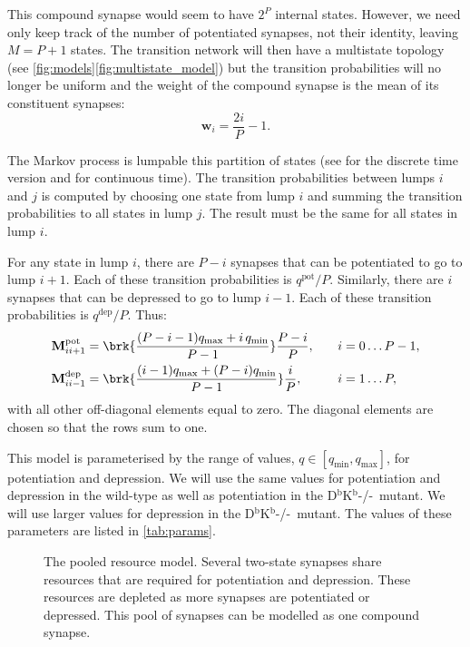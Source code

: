 \documentclass[12pt]{article}
\newcommand{\w}{\mathbf{w}}
\newcommand{\M}{\mathbf{M}}
\newcommand{\pot}{^{\text{pot}}}
\newcommand{\dep}{^{\text{dep}}}
\newcommand{\KO}{D$^\mathrm{b}$K$^\mathrm{b}$-/-}
\newcommand{\lmax}{_{\text{max}}}
\newcommand{\lmin}{_{\text{min}}}
\begin{document}
This compound synapse would seem to have $2^P$ internal states.
However, we need only keep track of the number of potentiated synapses, not their identity, leaving $M=P+1$ states.
The transition network will then have a multistate topology (see \autoref{fig:models}\ref{fig:multistate_model}) but the transition probabilities will no longer be uniform and the weight of the compound synapse is the mean of its constituent synapses:
%
\begin{equation}\label{eq:pooledweight}
  \w_i = \frac{2i}{P}-1.
\end{equation}
%


The Markov process is lumpable \wrt this partition of states (see \cite[\S6.3]{kemeny1960finite} for the discrete time version and \cite{burke1958markovian,Ball1993Lumpability} for continuous time).
The transition probabilities between lumps $i$ and $j$ is computed by choosing one state from lump $i$ and summing the transition probabilities to all states in lump $j$.
The result must be the same for all states in lump $i$.

For any state in lump $i$, there are $P-i$ synapses that can be potentiated to go to lump $i+1$.
Each of these transition probabilities is $q\pot/P$.
Similarly, there are $i$ synapses that can be depressed to go to lump $i-1$.
Each of these transition probabilities is $q\dep/P$.
Thus:
%
\begin{equation}\label{eq:pooledpotdep}
  \begin{aligned}
    \M\pot_{ii+1} &=  \brk{\frac{(P-i-1)q\lmax + i\,q\lmin}{P-1}} \frac{P-i}{P} ,
      \quad& i &= 0 \ldots P-1,\\
    \M\dep_{ii-1} &=  \brk{\frac{(i-1)q\lmax + (P-i)q\lmin}{P-1}} \frac{i}{P} ,
           & i &= 1 \ldots P,
  \end{aligned}
\end{equation}
%
with all other off-diagonal elements equal to zero.
The diagonal elements are chosen so that the rows sum to one.

This model is parameterised by the range of values, $q\in[q\lmin,q\lmax]$, for potentiation and depression.
We will use the same values for potentiation and depression in the wild-type as well as potentiation in the \KO\ mutant.
We will use larger values for depression in the \KO\ mutant.
The values of these parameters are listed in \autoref{tab:params}.


\begin{figure}
 \begin{center}
 \end{center}
  \caption[The pooled resource model]{The pooled resource model.
  Several two-state synapses share resources that are required for potentiation and depression.
  These resources are depleted as more synapses are potentiated or depressed.
  This pool of synapses can be modelled as one compound synapse.} \label{fig:pooled_model}
\end{figure}
\end{document}
